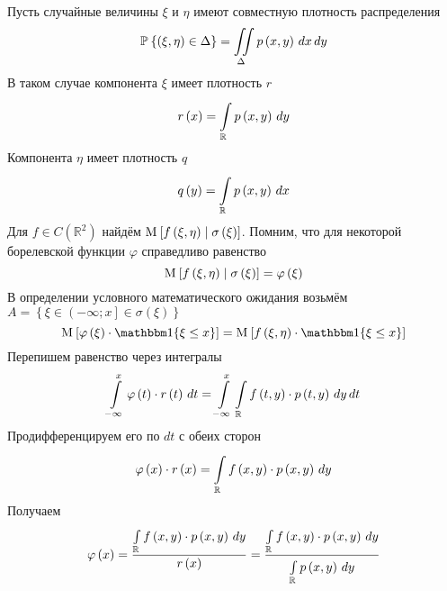 Пусть случайные величины $\xi$ и $\eta$ имеют совместную плотность
распределения
$$\Probability{\left( \xi, \eta \right) \in \Delta}
  = \iint\limits_\Delta\pdf{x,y} \, dx \, dy$$
В таком случае компонента $\xi$ имеет плотность $r$
$$r\left( x \right) = \integral{\mathbb{R}}{}{y}{\pdf{x,y}}$$
Компонента $\eta$ имеет плотность $q$
$$q\left( y \right) = \integral{\mathbb{R}}{}{x}{\pdf{x,y}}$$
Для $f \in C\left( \mathbb{R}^2 \right)$ найдём
$\Mean{f\left( \xi, \eta \right) \mcond \sigma\left( \xi \right)}$.
Помним, что для некоторой борелевской функции $\varphi$ справедливо равенство
\begin{equation*}
  \Mean{f\left( \xi, \eta \right) \mcond \sigma\left( \xi \right)}
  = \varphi\left( \xi \right)
\end{equation*}
В определении условного математического ожидания возьмём
$A = \left\{ \xi \in \left( -\infty; x \right]
  \in \sigma\left( \xi \right) \right\}$
\begin{equation*}
  \Mean{\varphi\left( \xi \right) \cdot \Indicator{\xi \le x}}
  = \Mean{f\left( \xi, \eta \right) \cdot \Indicator{\xi \le x}}
\end{equation*}
Перепишем равенство через интегралы
\begin{equation*}
  \integral{-\infty}{x}{t}{\varphi\left( t \right) \cdot r\left( t \right)}
  = \integral{-\infty}{x}{t}{
    \integralr{y}{f\left( t, y \right) \cdot \pdf{t, y}}}
\end{equation*}
Продифференцируем его по $dt$ с обеих сторон
\begin{equation*}
  \varphi\left( x \right) \cdot r\left( x \right)
  = \integralr{y}{f\left( x, y \right) \cdot \pdf{x, y}}
\end{equation*}
Получаем
\begin{equation*}
  \varphi\left( x \right)
  = \frac{\integralr{y}{f\left( x, y \right) \cdot \pdf{x, y}}}{
    r\left( x \right)}
  = \frac{\integralr{y}{f\left( x, y \right) \cdot \pdf{x, y}}}{
    \integralr{y}{\pdf{x, y}}}
\end{equation*}

